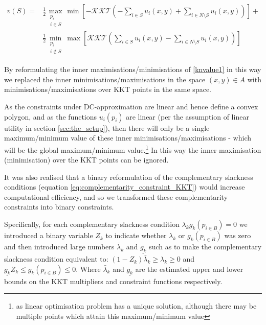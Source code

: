 \begin{equation}
\label{kkt_optimization1}
\begin{aligned}
v(S) =& 
 \frac{1}{2}\max_{\substack{p_i \\ i\in S}}   \min\left[-\mathcal{KKT}\left(-\sum_{i\in S} u_i(x,y) + \sum_{i\in N\setminus S}u_i(x,y)\right)\right] +\\
&\frac{1}{2}\min_{\substack{p_i \\ i\notin S}}\max\left[\mathcal{KKT}\left(\sum_{i\in S} u_i(x,y) - \sum_{i\in N\setminus S}u_i(x,y)\right)\right]
\end{aligned}
\end{equation}


By reformulating the inner maximisations/minimisations of \eqref{knvalue1} in this way we replaced the inner minimisations/maximisations in the space $(x,y)\in A$ with minimisations/maximisations over KKT points in the same space.%

As the constraints under DC-approximation are linear and hence define a convex polygon,
and as the functions $u_i(p_i)$ are linear (per the assumption of linear utility in section \ref{sec:the_setup}), then there will only be a single maximum/minimum value of these inner minimisations/maximisations - which will be the global maximum/minimum value.\footnote{as linear optimisation problem has a unique solution, although there may be multiple points which attain this maximum/minimum value}
In this way the inner maximisation (minimisation) over the KKT points can be ignored.

It was also realised that a binary reformulation of the complementary slackness conditions (equation \ref{eq:complementarity_constraint_KKT}) would increase computational efficiency, and so we transformed these complementarity constraints into \DIFdelbegin {}\DIFdelend \DIFaddbegin {}\DIFaddend binary constraints.

Specifically, for each complementary slackness condition $\lambda_kg_k(p_{i\in B}) = 0$ we introduced a binary variable $Z_k$ to indicate whether $\lambda_k$ or $g_k(p_{i\in B})$ was zero and then introduced large numbers $\bar{\lambda}_k$ and $ \underline{g_k} $ such as to make the complementary slackness condition equivalent to: $(1-Z_k)\bar{\lambda}_k \ge \lambda_k \ge 0$ and $\underline{g_k}Z_k\le g_k(p_{i\in B})\le 0$.
Where $\bar{\lambda}_k$ and $\underline{g_k}$ are the estimated upper and lower bounds on the KKT multipliers and constraint functions respectively.

